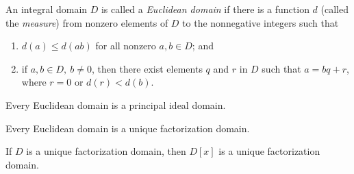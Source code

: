 
\begin{definition}
	An integral domain $D$ is called a \textit{Euclidean domain} if there is a function $d$ (called the \textit{measure}) from nonzero elements of $D$ to the nonnegative integers such that
	\begin{enumerate}
		\item $d(a) \leq d(ab)$ for all nonzero $a,b \in D$; and
		\item if $a,b \in D,\ b \neq 0$, then there exist elements $q$ and $r$ in $D$ such that $a = bq + r$, where $r = 0$ or $d(r) < d(b)$.
	\end{enumerate}
\end{definition}

\begin{theorem}
	Every Euclidean domain is a principal ideal domain.
\end{theorem}

\begin{corollary}
	Every Euclidean domain is a unique factorization domain.
\end{corollary}

\begin{theorem}
	If $D$ is a unique factorization domain, then $D[x]$ is a unique factorization domain.
\end{theorem}
